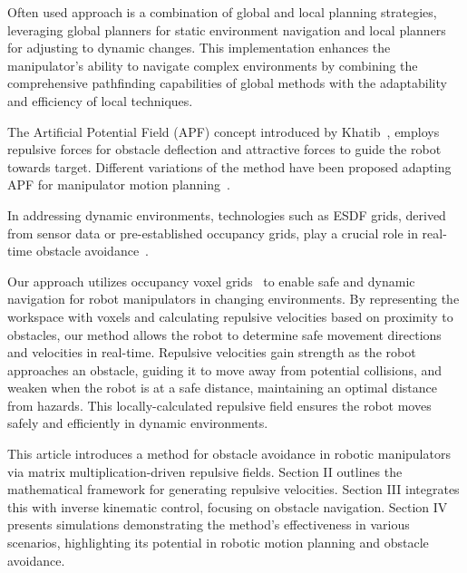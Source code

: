 \documentclass[letterpaper, 10 pt, conference]{ieeeconf}  %
\begin{document}
Often used approach is a combination of global and local planning strategies, leveraging global planners for static environment navigation and local planners for adjusting to dynamic changes. This implementation enhances the manipulator's ability to navigate complex environments by combining the comprehensive pathfinding capabilities of global methods with the adaptability and efficiency of local techniques.

The Artificial Potential Field (APF) concept introduced by Khatib~\cite{c33}, employs repulsive forces for obstacle deflection and attractive forces to guide the robot towards target. Different variations of the method have been proposed adapting APF for manipulator motion planning~\cite{klancar2022robot, c49,park2020trajectory,baumgartner2023potential, c30}.

In addressing dynamic environments, technologies such as ESDF grids, derived from sensor data or pre-established occupancy grids, play a crucial role in real-time obstacle avoidance~\cite{oleynikova2017voxblox,han2019fiesta,zhou2021egoplanner}. 


Our approach utilizes occupancy voxel grids~\cite{han2018dynamic} to enable safe and dynamic navigation for robot manipulators in changing environments. By representing the workspace with voxels and calculating repulsive velocities based on proximity to obstacles, our method allows the robot to determine safe movement directions and velocities in real-time. Repulsive velocities gain strength as the robot approaches an obstacle, guiding it to move away from potential collisions, and weaken when the robot is at a safe distance, maintaining an optimal distance from hazards. This locally-calculated repulsive field ensures the robot moves safely and efficiently in dynamic environments.

This article introduces a method for obstacle avoidance in robotic manipulators via matrix multiplication-driven repulsive fields. Section II outlines the mathematical framework for generating repulsive velocities. Section III integrates this with inverse kinematic control, focusing on obstacle navigation. Section IV presents simulations demonstrating the method's effectiveness in various scenarios, highlighting its potential in robotic motion planning and obstacle avoidance.
\end{document}

